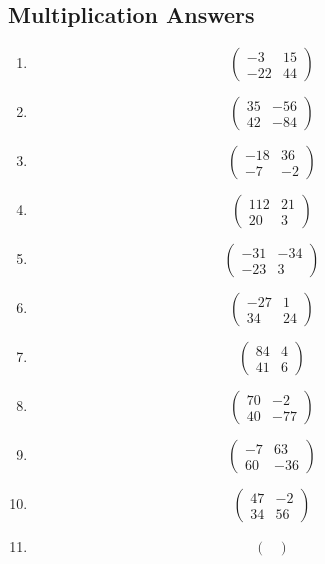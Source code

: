 \documentclass{article}%
\begin{document}
\subsection{Multiplication Answers}%
\begin{enumerate}[label=\arabic*)]%
\item%
\[%
\begin{pmatrix}%
-3&15\\%
-22&44%
\end{pmatrix}%
\]%
\item%
\[%
\begin{pmatrix}%
35&-56\\%
42&-84%
\end{pmatrix}%
\]%
\item%
\[%
\begin{pmatrix}%
-18&36\\%
-7&-2%
\end{pmatrix}%
\]%
\item%
\[%
\begin{pmatrix}%
112&21\\%
20&3%
\end{pmatrix}%
\]%
\item%
\[%
\begin{pmatrix}%
-31&-34\\%
-23&3%
\end{pmatrix}%
\]%
\item%
\[%
\begin{pmatrix}%
-27&1\\%
34&24%
\end{pmatrix}%
\]%
\item%
\[%
\begin{pmatrix}%
84&4\\%
41&6%
\end{pmatrix}%
\]%
\item%
\[%
\begin{pmatrix}%
70&-2\\%
40&-77%
\end{pmatrix}%
\]%
\item%
\[%
\begin{pmatrix}%
-7&63\\%
60&-36%
\end{pmatrix}%
\]%
\item%
\[%
\begin{pmatrix}%
47&-2\\%
34&56%
\end{pmatrix}%
\]%
\item%
\[%
\begin{pmatrix}%

\end{pmatrix}\]
\end{enumerate}
\end{document}
